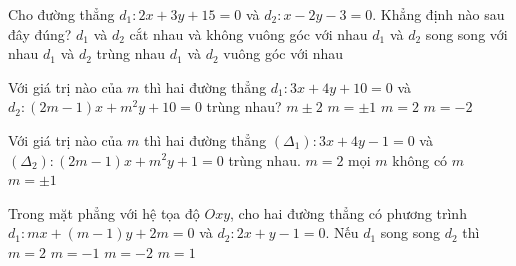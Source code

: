 \begin{ex}%
	Cho đường thẳng $d_1\colon  2 x+3 y+15=0$ và $d_2\colon x-2 y-3=0$. Khẳng định nào sau đây đúng?
	\choice 
		{\True $d_1$ và $d_2$ cắt nhau và không vuông góc với nhau} 
		{$d_1$ và $d_2$ song  song với nhau}
		{$d_1$ và $d_2$  trùng nhau}
		{$d_1$ và $d_2$ vuông góc  với nhau}
\end{ex}

\begin{ex}%
	Với giá trị  nào của $m$ thì hai đường thẳng $d_1\colon 3 x+4 y+10=0$ và $d_2\colon(2 m-1) x+m^2 y+10=0$ trùng nhau?
	\choice 
		{$m \pm  2$}
		{$m=  \pm 1$}
		{\True  $m=2$}
		 {$m=-2$}
\end{ex}

\begin{ex}%
	Với giá trị nào của $m$  thì hai đường thẳng $\left(\Delta_1\right)\colon 3 x+4 y-1=0$ và $\left(\Delta_2\right)\colon(2 m-1) x+m^2 y+1=0$ trùng nhau.
	\choice 
		 {$m=2$}
		{mọi $m$} 
		 {\True không có $m$}
		 {$m= \pm 1$}
\end{ex}

\begin{ex}%
	Trong mặt phẳng với hệ tọa độ $O x y$, cho hai  đường thẳng có phương trình \break $d_1 \colon m x+(m-1) y+2 m=0$ và $d_2 \colon 2 x+y-1=0$. Nếu $d_1$ song song $d_2$ thì
	\choice 
		{\True $m=2$} 
		 {$m=-1$}
		{$m=-2$} 
		{$m=1$} 
\end{ex}

